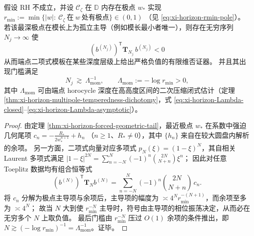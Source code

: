 \begin{theorem}\label{thm:xi-endpoint-binomial-falsifier}
假设 RH 不成立，并设 \(\mathscr{C}_{\zeta}\) 在 \(\mathbb{D}\) 内存在极点 \(w_\ast\) 实现
\(
r_{\min}:=\min\{|w|:\ \mathscr{C}_{\zeta}\ \text{在}\ w\ \text{处有极点}\}\in(0,1)
\)
（见 \eqref{eq:xi-horizon-rmin-pole}）。
若该最深极点在模长上为孤立主导（例如模长最小者唯一），则存在无穷序列 \(N_j\to\infty\) 使
\[
\boxed{\;
(b^{(N_j)})^{\mathsf T}\mathbf{T}_{N_j}\,b^{(N_j)}<0\;}
\]
从而端点二项式模板在某些深度层级上给出严格负值的有限维否证器。
并且其出现门槛满足
\[
N_j\ \gtrsim\ \Lambda_{\mathrm{mom}}^{-1},
\qquad
\Lambda_{\mathrm{mom}}:=-\log r_{\min}>0,
\]
其中 \(\Lambda_{\mathrm{mom}}\) 可由端点 horocycle 深度在高高度区间的二次压缩闭式估计（定理 \ref{thm:xi-horizon-multipole-temperedness-dichotomy}，式 \eqref{eq:xi-horizon-Lambda-closed}--\eqref{eq:xi-horizon-Lambda-asymptotic}）。
\end{theorem}

\begin{proof}
由定理 \ref{thm:xi-horizon-forced-geometric-tail}，最近极点 \(w_\ast\) 在系数中强迫几何尾项
\(
c_n=-\frac{R_\ast}{2w_\ast^{n+1}}+h_n
\)
（\(n\ge 1\)、\(R_\ast\neq 0\)），其中 \(\{h_n\}\) 来自在较大圆盘内解析的余项。
另一方面，二项式向量对应多项式 \(p_N(\xi)=(1-\xi)^N\)，其自相关 Laurent 多项式满足
\(
|1-\xi|^{2N}=\sum_{n=-N}^{N}(-1)^n\binom{2N}{N+n}\xi^n
\)；
因此对任意 Toeplitz 数据均有组合恒等式
\[
(b^{(N)})^{\mathsf T}\mathbf{T}_N b^{(N)}
=\sum_{n=-N}^{N}(-1)^n\binom{2N}{N+n}\,c_n.
\]
将 \(c_n\) 分解为极点主导项与余项后，主导项的幅度为 \(\asymp 4^N r_{\min}^{-(N+1)}\)，而余项至多为 \(\asymp 4^N\)；
故当 \(N\) 大到使 \(r_{\min}^{-N}\) 主导时，符号由主导项的相位振荡决定，从而必在无穷多个 \(N\) 上取负值。
最后门槛由 \(r_{\min}^{-N}\) 压过 \(O(1)\) 余项的条件推出，即 \(N\gtrsim (-\log r_{\min})^{-1}=\Lambda_{\mathrm{mom}}^{-1}\)。证毕。
\end{proof}

\endinput
